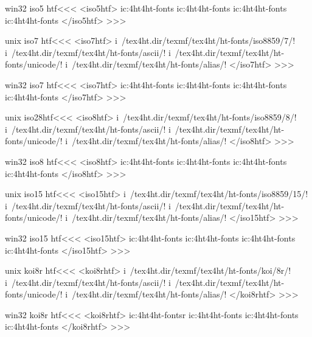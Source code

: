 \documentclass{article}
\begin{document}
\<win32 iso5 htf\><<<
<iso5htf>
ic:\tex4ht\texmf\tex4ht\ht-fonts\5\!
ic:\tex4ht\texmf\tex4ht\ht-fonts\ascii\!
ic:\tex4ht\texmf\tex4ht\ht-fonts\alias\!
ic:\tex4ht\texmf\tex4ht\ht-fonts\unicode\!
</iso5htf>
>>>



\<unix iso7 htf\><<<
<iso7htf>
i~/tex4ht.dir/texmf/tex4ht/ht-fonts/iso8859/7/!
i~/tex4ht.dir/texmf/tex4ht/ht-fonts/ascii/!
i~/tex4ht.dir/texmf/tex4ht/ht-fonts/unicode/!
i~/tex4ht.dir/texmf/tex4ht/ht-fonts/alias/!
</iso7htf>
>>>


\<win32 iso7 htf\><<<
<iso7htf>
ic:\tex4ht\texmf\tex4ht\ht-fonts\7\!
ic:\tex4ht\texmf\tex4ht\ht-fonts\ascii\!
ic:\tex4ht\texmf\tex4ht\ht-fonts\alias\!
ic:\tex4ht\texmf\tex4ht\ht-fonts\unicode\!
</iso7htf>
>>>




\<unix iso28htf\><<<
<iso8htf>
i~/tex4ht.dir/texmf/tex4ht/ht-fonts/iso8859/8/!
i~/tex4ht.dir/texmf/tex4ht/ht-fonts/ascii/!
i~/tex4ht.dir/texmf/tex4ht/ht-fonts/unicode/!
i~/tex4ht.dir/texmf/tex4ht/ht-fonts/alias/!
</iso8htf>
>>>


\<win32 iso8 htf\><<<
<iso8htf>
ic:\tex4ht\texmf\tex4ht\ht-fonts\8\!
ic:\tex4ht\texmf\tex4ht\ht-fonts\ascii\!
ic:\tex4ht\texmf\tex4ht\ht-fonts\alias\!
ic:\tex4ht\texmf\tex4ht\ht-fonts\unicode\!
</iso8htf>
>>>


\<unix iso15 htf\><<<
<iso15htf>
i~/tex4ht.dir/texmf/tex4ht/ht-fonts/iso8859/15/!
i~/tex4ht.dir/texmf/tex4ht/ht-fonts/ascii/!
i~/tex4ht.dir/texmf/tex4ht/ht-fonts/unicode/!
i~/tex4ht.dir/texmf/tex4ht/ht-fonts/alias/!
</iso15htf>
>>>


\<win32 iso15 htf\><<<
<iso15htf>
ic:\tex4ht\texmf\tex4ht\ht-fonts\!
ic:\tex4ht\texmf\tex4ht\ht-fonts\ascii\!
ic:\tex4ht\texmf\tex4ht\ht-fonts\alias\!
ic:\tex4ht\texmf\tex4ht\ht-fonts\unicode\!
</iso15htf>
>>>







\<unix koi8r htf\><<<
<koi8rhtf>
i~/tex4ht.dir/texmf/tex4ht/ht-fonts/koi/8r/!
i~/tex4ht.dir/texmf/tex4ht/ht-fonts/ascii/!
i~/tex4ht.dir/texmf/tex4ht/ht-fonts/unicode/!
i~/tex4ht.dir/texmf/tex4ht/ht-fonts/alias/!
</koi8rhtf>
>>>


\<win32 koi8r htf\><<<
<koi8rhtf>
ic:\tex4ht\texmf\tex4ht\ht-fonts\koi\8r\!
ic:\tex4ht\texmf\tex4ht\ht-fonts\ascii\!
ic:\tex4ht\texmf\tex4ht\ht-fonts\alias\!
ic:\tex4ht\texmf\tex4ht\ht-fonts\unicode\!
</koi8rhtf>
>>>
\end{document}
